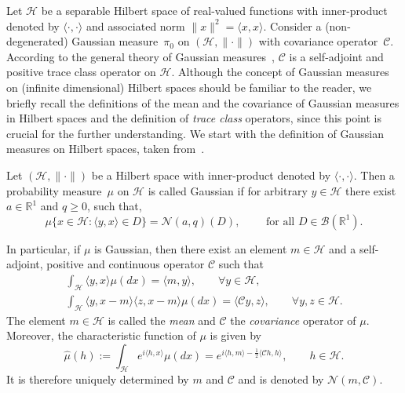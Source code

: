 Let $\mathcal{H}$ be a separable Hilbert space of real-valued functions with inner-product denoted by $\langle \cdot, \cdot \rangle$ and associated norm $\|x\|^2 = \langle x, x \rangle$. Consider a (non-degenerated) Gaussian measure~$\pi_0$ on $(\mathcal{H}, \|\cdot\|)$ with covariance operator~$\mathcal{C}$. According to the general theory of Gaussian measures~\autocite[Chapter I]{DaPrato1992}, $\mathcal{C}$ is a self-adjoint and positive trace class operator on $\mathcal{H}$. Although the concept of Gaussian measures on (infinite dimensional) Hilbert spaces should be familiar to the reader, we briefly recall the definitions of the mean and the covariance of Gaussian measures in Hilbert spaces and the definition of \textit{trace class} operators, since this point is crucial for the further understanding. We start with the definition of Gaussian measures on Hilbert spaces, taken from~\autocite[Section 2.3.2]{DaPrato1992}.

\begin{defin}
\label{DLR-Setting: Definition Gaussian measure}
 Let $(\mathcal{H}, \|\cdot\|)$ be a Hilbert space with inner-product denoted by $\langle \cdot, \cdot \rangle$. Then a probability measure~$\mu$ on $\mathcal{H}$ is called Gaussian if for arbitrary $y \in \mathcal{H}$ there exist $a \in \mathbb{R}^1$ and $ q \geq 0$, such that,
 \begin{equation*}
   \mu \{ x \in \mathcal{H}: \langle y, x \rangle \in D \} = \mathcal{N}(a, q) (D), \qquad \text{ for all } D \in \mathcal{B}(\mathbb{R}^1).
 \end{equation*}
\end{defin}

 In particular, if $\mu$ is Gaussian, then there exist an element $m \in \mathcal{H}$ and a self-adjoint, positive and continuous operator $\mathcal{C}$ such that
 \begin{align}
  \int_{\mathcal{H}} \langle y, x \rangle \mu (dx) = \langle m, y \rangle, \qquad \forall y \in \mathcal{H}, \\
  \int_{\mathcal{H}} \langle y, x - m \rangle \langle z, x - m \rangle \mu (dx) = \langle \mathcal{C}y, z \rangle, \qquad \forall y, z \in \mathcal{H}.
 \end{align}
The element $m \in \mathcal{H}$ is called the \textit{mean} and $\mathcal{C}$ the \textit{covariance} operator of $\mu$. Moreover, the characteristic function of $\mu$ is given by 
\begin{equation*}
 \widehat{\mu} (h) := \int_{\mathcal{H}} e^{i \langle h, x \rangle} \mu(dx) = e^{i \langle h, m \rangle - \tfrac{1}{2} \langle \mathcal{C} h, h \rangle}, \qquad h \in \mathcal{H}.
\end{equation*}
It is therefore uniquely determined by $m$ and $\mathcal{C}$ and is denoted by $ \mathcal{N}(m, \mathcal{C})$.


